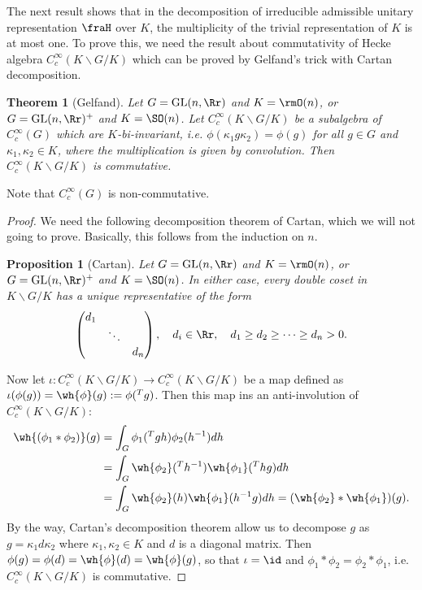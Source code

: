 \documentclass{article}
\newtheorem{theorem}{Theorem}[section]
\newcommand{\pre}[1]{\prescript{#1}{}}
\newcommand{\GL}{\mathrm{GL}}
\newtheorem{proposition}{Proposition}[section]
\begin{document}
The next result shows that in the decomposition of irreducible admissible unitary representation $\fraH$ over $K$, the multiplicity of the trivial representation of $K$ is at most one. 
To prove this, we need the result about commutativity of Hecke algebra $C^{\infty}_{c}(K\backslash G/K)$ which can be proved by Gelfand's trick with Cartan decomposition. 

\begin{theorem}[Gelfand]
\label{archec}
Let $G = \GL(n, \Rr)$ and $K = \rmO(n)$, or $G = \GL(n, \Rr)^{+}$ and $K = \SO(n)$. Let $C_{c}^{\infty}(K\backslash G/K)$ be a subalgebra of $C_{c}^{\infty}(G)$ which are $K$-bi-invariant, i.e. $\phi(\kappa_{1}g\kappa_{2})=\phi(g)$ for all $g\in G$ and $\kappa_{1}, \kappa_{2}\in K$, where the multiplication is given by convolution. 
Then $C_{c}^{\infty}(K\backslash G/K)$ is commutative. 
\end{theorem}
Note that $C_{c}^{\infty}(G)$ is non-commutative. 
\begin{proof}
We need the following decomposition theorem of Cartan, which we will not going to prove. Basically, this follows from the induction on $n$. 
\begin{proposition}[Cartan]
Let $G = \GL(n, \Rr)$ and $K = \rmO(n)$, or $G = \GL(n, \Rr)^{+}$ and $K = \SO(n)$. 
In either case, every double coset in $K\backslash G/K$ has a unique representative of the form 
$$
\begin{pmatrix} d_{1} & & \\ & \ddots & \\ & & d_{n}\end{pmatrix}, \quad d_{i}\in \Rr, \quad d_{1} \geq d_{2} \geq \dots \geq d_{n} >0.
$$
\end{proposition}
Now let $\iota:C^{\infty}_{c}(K\backslash G / K)\to C^{\infty}_{c}(K\backslash G /K)$ be a map defined as $\iota(\phi(g))= \wh{\phi}(g) := \phi(\pre{T}{g})$. 
Then this map ins an anti-involution of $C^{\infty}_{c}(K\backslash G / K)$:
\begin{align*}
\wh{(\phi_{1}*\phi_{2})}(g) &= \int_{G} \phi_{1}(\pre{T}{}gh)\phi_{2}(h^{-1})dh \\
&= \int_{G} \wh{\phi_{2}}({}^{T}h^{-1}) \wh{\phi_{1}}({}^{T}hg) dh \\
&= \int_{G} \wh{\phi_{2}}(h) \wh{\phi_{1}}(h^{-1}g)dh = (\wh{\phi_{2}} * \wh{\phi_{1}})(g). 
\end{align*}
By the way, Cartan's decomposition theorem allow us to decompose $g$ as $g = \kappa_{1} d\kappa_{2}$ where $\kappa_{1}, \kappa_{2}\in K$ and $d$ is a diagonal matrix. Then 
$\phi(g) = \phi(d) = \wh{\phi}(d) = \wh{\phi}(g)$, so that $\iota = \id$ and $\phi_{1} * \phi_{2} = \phi_{2} * \phi_{1}$, i.e. $C_{c}^{\infty}(K\backslash G /K)$ is commutative. 
\end{proof}
\end{document}
